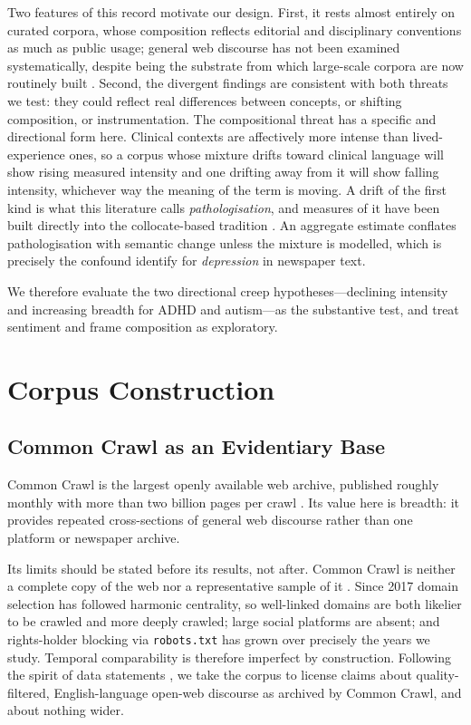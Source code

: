 \documentclass[final]{clv2025}
\begin{document}
Two features of this record motivate our design. First, it rests almost entirely on
curated corpora, whose composition reflects editorial and disciplinary conventions as much
as public usage; general web discourse has not been examined systematically, despite being
the substrate from which large-scale corpora are now routinely built
\citep{wenzekCCNetExtractingHigh2019,penedoFineWeb2024}. Second, the divergent findings are consistent with
both threats we test: they could reflect real differences between concepts, or shifting
composition, or instrumentation. The compositional threat has a specific and directional
form here. Clinical contexts are affectively more intense than lived-experience ones, so a
corpus whose mixture drifts toward clinical language will show rising measured intensity and
one drifting away from it will show falling intensity, whichever way the meaning of the term
is moving. A drift of the first kind is what this literature calls \emph{pathologisation},
and measures of it have been built directly into the collocate-based tradition
\citep{baesSemanticShiftsMental2023,baesMultidimensionalFrameworkEvaluating2024}. An
aggregate estimate conflates pathologisation with semantic change unless the mixture is
modelled, which is precisely the confound \citet{pislRevisitingSemanticSeverity2025}
identify for \emph{depression} in newspaper text.

We therefore evaluate the two directional creep hypotheses---declining intensity and
increasing breadth for ADHD and autism---as the substantive test, and treat sentiment and
frame composition as exploratory.

\section{Corpus Construction}
\label{sec:corpus}

\subsection{Common Crawl as an Evidentiary Base}

Common Crawl is the largest openly available web archive, published roughly monthly with
more than two billion pages per crawl \citep{CommonCrawlGet}. Its value here is breadth: it
provides repeated cross-sections of general web discourse rather than one platform or
newspaper archive.

Its limits should be stated before its results, not after. Common Crawl is neither a
complete copy of the web nor a representative sample of it \citep{baackCriticalAnalysisLargest2024}.
Since 2017 domain selection has followed harmonic centrality, so well-linked domains are
both likelier to be crawled and more deeply crawled; large social platforms are absent;
and rights-holder blocking via \texttt{robots.txt} has grown over precisely the years we
study. Temporal comparability is therefore imperfect by construction. Following the spirit
of data statements \citep{bender-friedman-2018-data,elazarWIMBD2024}, we take the corpus to
license claims about quality-filtered, English-language open-web discourse as archived by
Common Crawl, and about nothing wider.
\end{document}
